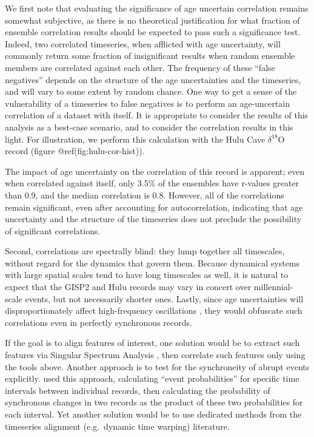 \documentclass[gchron, manuscript]{copernicus}
\begin{document}
We first note that evaluating the significance of age uncertain
correlation remains somewhat subjective, as there is no theoretical
justification for what fraction of ensemble correlation results should
be expected to pass such a significance test. Indeed, two correlated
timeseries, when afflicted with age uncertainty, will commonly return
some fraction of insignificant results when random ensemble members are
correlated against each other. The frequency of these ``false
negatives'' depends on the structure of the age uncertainties and the
timeseries, and will vary to some extent by random chance. One way to
get a sense of the vulnerability of a timeseries to false negatives is
to perform an age-uncertain correlation of a dataset with itself. It is
appropriate to consider the results of this analysis as a best-case
scenario, and to consider the correlation results in this light. For
illustration, we perform this calculation with the Hulu Cave
\(\delta^{18}\)O record (figure @ref(fig:hulu-cor-hist)).

The impact of age uncertainty on the correlation of this record is
apparent; even when correlated against itself, only 3.5\% of the
ensembles have r-values greater than 0.9, and the median correlation is
0.8. However, all of the correlations remain significant, even after
accounting for autocorrelation, indicating that age uncertainty and the
structure of the timeseries does not preclude the possibility of
significant correlations.

Second, correlations are spectrally blind: they lump together all
timescales, without regard for the dynamics that govern them. Because
dynamical systems with large spatial scales tend to have long timescales
as well, it is natural to expect that the GISP2 and Hulu records may
vary in concert over millennial-scale events, but not necessarily
shorter ones. Lastly, since age uncertainties will disproportionately
affect high-frequency oscillations \citep[e.g.][]{BAM}, they would
obfuscate such correlations even in perfectly synchronous records.

If the goal is to align features of interest, one solution would be to
extract such features via Singular Spectrum Analysis
\citep{Vautard89, Vautard1992}, then correlate such features only using
the tools above. Another approach is to test for the synchroneity of
abrupt events explicitly. \citet{blaauw2010were} used this approach,
calculating ``event probabilities'' for specific time intervals between
individual records, then calculating the probability of synchronous
changes in two records as the product of these two probabilities for
each interval. Yet another solution would be to use dedicated methods
from the timeseries alignment (e.g.~dynamic time warping) literature.
\end{document}
